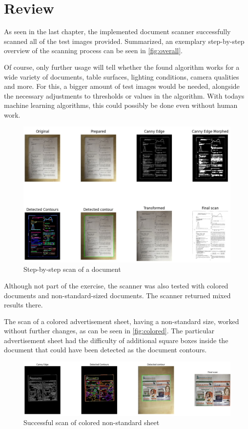 \chapter{Review}

As seen in the last chapter, the implemented document scanner successfully scanned all of the test images provided. Summarized, an exemplary step-by-step overview of the scanning process can be seen in \autoref{fig:overall}.

Of course, only further usage will tell whether the found algorithm works for a wide variety of documents, table surfaces, lighting conditions, camera qualities and more. For this, a bigger amount of test images would be needed, alongside the necessary adjustments to thresholds or values in the algorithm. With todays machine learning algorithms, this could possibly be done even without human work.

\begin{figure}[h]
    \includegraphics[width=1\textwidth]{figures/allsteps.jpg}
    \centering
    \caption{Step-by-step scan of a document}
    \label{fig:overall}
\end{figure}

Although not part of the exercise, the scanner was also tested with colored documents and non-standard-sized documents. The scanner returned mixed results there.

The scan of a colored advertisement sheet, having a non-standard size, worked without further changes, as can be seen in \autoref{fig:colored}. The particular advertisement sheet had the difficulty of additional square boxes inside the document that could have been detected as the document contours.

\begin{figure}[h]
    \includegraphics[width=1\textwidth]{figures/colored.jpg}
    \centering
    \caption{Successful scan of colored non-standard sheet}
    \label{fig:colored}
\end{figure}

